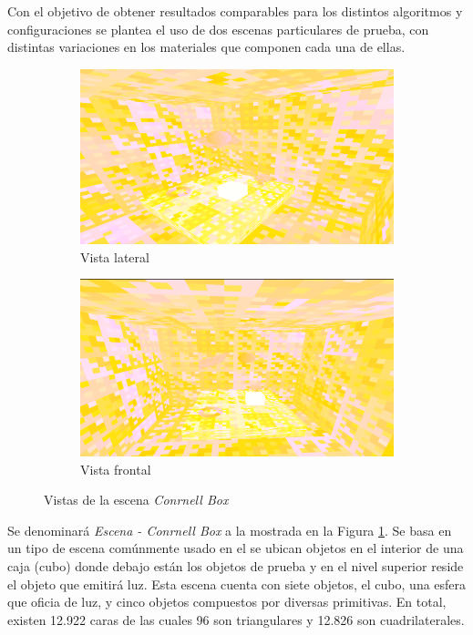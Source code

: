 Con el objetivo de obtener resultados comparables para los distintos algoritmos y configuraciones se plantea el uso de dos escenas particulares de prueba, con distintas variaciones en los materiales que componen cada una de ellas.


\begin{figure}[H]
	\centering
	\begin{subfigure}{0.45\textwidth}
		\includegraphics[width=1\linewidth]{assets/cornell}
		\caption{Vista lateral}
	\end{subfigure}
	\begin{subfigure}{0.45\textwidth}
		\includegraphics[width=1\linewidth]{assets/cornell2}
		\caption{Vista frontal}
	\end{subfigure}
	\caption{Vistas de la escena \textit{Conrnell Box}}
	\label{img:cornell}
\end{figure}

Se denominará \textit{Escena - Conrnell Box} a la mostrada en la Figura \ref{img:cornell}. Se basa en un tipo de escena comúnmente usado en el se ubican objetos en el interior de una caja (cubo) donde debajo están los objetos de prueba y en el nivel superior reside el objeto que emitirá luz. Esta escena cuenta con siete objetos, el cubo, una esfera que oficia de luz, y cinco objetos compuestos por diversas primitivas. En total, existen 12.922 caras de las cuales 96 son triangulares y 12.826 son cuadrilaterales.


